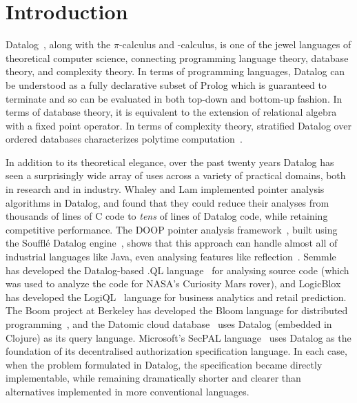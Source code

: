 \section{Introduction}
\label{sec:intro}

Datalog~\cite{datalog}, along with the $\pi$-calculus and \fn-calculus, is one
of the jewel languages of theoretical computer science, connecting programming
language theory, database theory, and complexity theory. In terms of programming
languages, Datalog can be understood as a fully declarative subset of Prolog
which is guaranteed to terminate and so can be evaluated in both top-down and
bottom-up fashion. In terms of database theory, it is equivalent to the
extension of relational algebra with a fixed point operator. In terms of
complexity theory, stratified Datalog over ordered databases characterizes
polytime computation~\cite{datalog-polytime}.

In addition to its theoretical elegance, over the past twenty years
Datalog has seen a surprisingly wide array of uses across a variety of
practical domains, both in research and in industry.
%
Whaley and Lam \cite{whaley-lam,whaley-phd} implemented pointer analysis
algorithms in Datalog, and found that they could reduce their analyses from
thousands of lines of C code to \emph{tens} of lines of Datalog code, while
retaining competitive performance. The DOOP pointer analysis
framework~\cite{doop}, built using the Souffl\'{e} Datalog
engine~\cite{souffle}, shows that this approach can handle almost all of
industrial languages like Java, even analysing features like
reflection~\cite{doop-java-reflection}. Semmle has developed the Datalog-based
.QL language~\cite{semmlecode,ql-inference} for analysing source code (which was
used to analyze the code for NASA's Curiosity Mars rover), and LogicBlox has
developed the LogiQL~\cite{logicblox} language for business analytics and retail
prediction. The Boom project at Berkeley has developed the Bloom language for
distributed programming~\cite{bloom}, and the Datomic cloud
database~\cite{datomic} uses Datalog (embedded in Clojure) as its query
language. Microsoft's SecPAL language~\cite{secpal} uses Datalog as the
foundation of its decentralised authorization specification language. In each
case, when the problem formulated in Datalog, the specification became directly
implementable, while remaining dramatically shorter and clearer than
alternatives implemented in more conventional languages.


